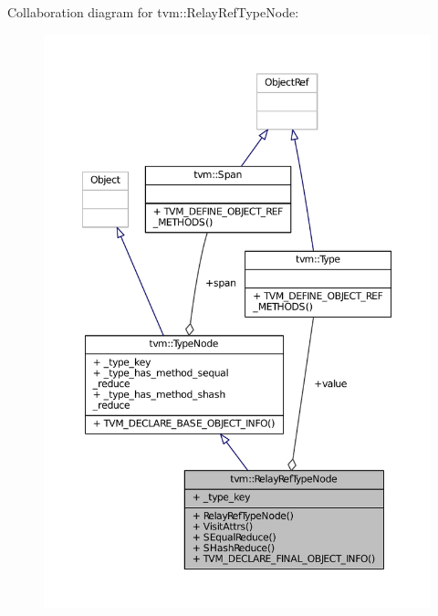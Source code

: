 Collaboration diagram for tvm\+:\+:Relay\+Ref\+Type\+Node\+:
\nopagebreak
\begin{figure}[H]
\begin{center}
\leavevmode
\includegraphics[width=350pt]{classtvm_1_1RelayRefTypeNode__coll__graph}
\end{center}
\end{figure}
